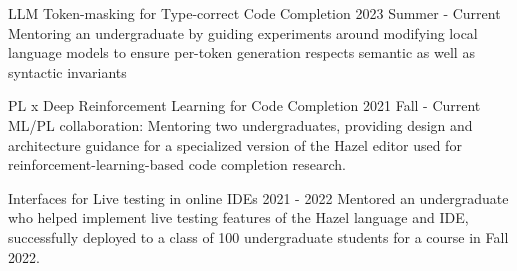 \documentclass[10pt,a4paper]{article}
\begin{document}

  \headedsubsection
    {LLM Token-masking for Type-correct Code Completion}
    {2023 Summer - Current}
    {Mentoring an undergraduate by guiding experiments around modifying local language models to ensure per-token generation respects semantic as well as syntactic invariants}

  \headedsubsection
    {PL x Deep Reinforcement Learning for Code Completion}
    {2021 Fall - Current}
    {ML/PL collaboration: Mentoring two undergraduates, providing design and architecture guidance for a specialized version of the Hazel editor used for reinforcement-learning-based code completion research.}
  
  \headedsubsection
    {Interfaces for Live testing in online IDEs}
    {2021 - 2022}
    {Mentored an undergraduate who helped implement live testing features of the Hazel language and IDE, successfully deployed to a class of 100 undergraduate students for a course in Fall 2022.}

    
\end{document}
